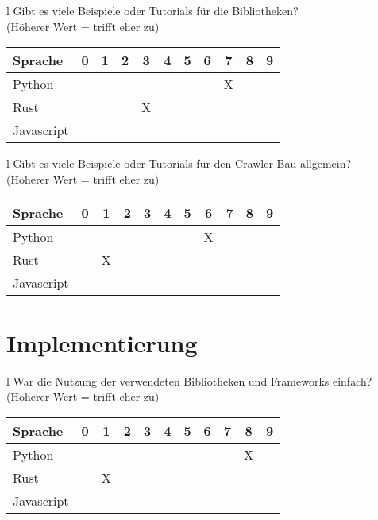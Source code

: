 \begin{tabular}{l}
	Gibt es viele Beispiele oder Tutorials für die Bibliotheken? \\
	(Höherer Wert = trifft eher zu)                              \\
	\begin{tabular}{| l | c | c | c | c | c | c | c | c | c | c |}
		\hline
		Sprache    & 0 & 1 & 2 & 3 & 4 & 5 & 6 & 7 & 8 & 9 \\
		\hline
		Python     &   &   &   &   &   &   &   & X &   &   \\
		\hline
		Rust       &   &   &   & X &   &   &   &   &   &   \\
		\hline
		Javascript &   &   &   &   &   &   &   &   &   &   \\
		\hline
	\end{tabular}
\end{tabular}

\begin{tabular}{l}
	Gibt es viele Beispiele oder Tutorials für den Crawler-Bau allgemein? \\
	(Höherer Wert = trifft eher zu)                                       \\
	\begin{tabular}{| l | c | c | c | c | c | c | c | c | c | c |}
		\hline
		Sprache    & 0 & 1 & 2 & 3 & 4 & 5 & 6 & 7 & 8 & 9 \\
		\hline
		Python     &   &   &   &   &   &   & X &   &   &   \\
		\hline
		Rust       &   & X &   &   &   &   &   &   &   &   \\
		\hline
		Javascript &   &   &   &   &   &   &   &   &   &   \\
		\hline
	\end{tabular}
\end{tabular}

\section{Implementierung}

\begin{tabular}{l}
	War die Nutzung der verwendeten Bibliotheken und Frameworks einfach? \\
	(Höherer Wert = trifft eher zu)                                      \\
	\begin{tabular}{| l | c | c | c | c | c | c | c | c | c | c |}
		\hline
		Sprache    & 0 & 1 & 2 & 3 & 4 & 5 & 6 & 7 & 8 & 9 \\
		\hline
		Python     &   &   &   &   &   &   &   &   & X &   \\
		\hline
		Rust       &   & X &   &   &   &   &   &   &   &   \\
		\hline
		Javascript &   &   &   &   &   &   &   &   &   &   \\
		\hline
	\end{tabular}
\end{tabular}


